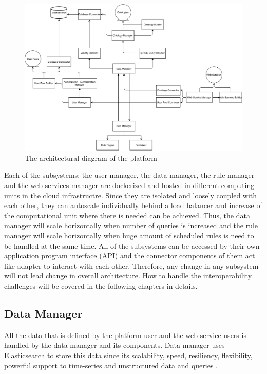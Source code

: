 \begin{figure}[htpb]
  \centering
  \includegraphics[width=\textwidth,height=\textheight,keepaspectratio]{figures/architectural_diagram.pdf}
  \caption[Platform Architecture]{The architectural diagram of the platform}\label{fig:architecture}
\end{figure}

Each of the subsystems; the user manager, the data manager, the rule manager and the web services manager are dockerized and hosted in different computing units in the cloud infrastructre. Since they are isolated and loosely coupled with each other, they can autoscale individually behind a load balancer and increase of the computational unit where there is needed can be achieved. Thus, the data manager will scale horizontally when number of queries is increased and the rule manager will scale horizontally when huge amount of scheduled rules is need to be handled at the same time. All of the subsystems can be accessed by their own application program interface (API) and the connector components of them act like adapter to interact with each other. Therefore, any change in any subsystem will not lead change in overall architecture. How to handle the interoperability challenges will be covered in the following chapters in details.


\subsection{Data Manager}

All the data that is defined by the platform user and the web service users is handled by the data manager and its components. Data manager uses Elasticsearch to store this data since its scalability, speed, resiliency, flexibility, powerful support to time-series and unstructured data and queries \cite{elastic, elastic_time}.

